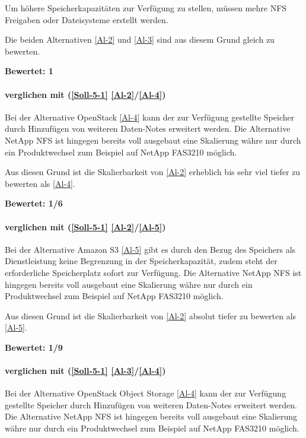 Um höhere Speicherkapazitäten zur Verfügung zu stellen, müssen mehre NFS Freigaben oder Dateisysteme erstellt werden.

Die beiden Alternativen  \ref{Al-2} und  \ref{Al-3} sind aus diesem Grund gleich zu bewerten.

\textbf{Bewertet: 1}


\paragraph*{  verglichen mit  (\ref{Soll-5-1} \ref{Al-2}/\ref{Al-4})}
Bei der Alternative OpenStack \ref{Al-4} kann der zur Verfügung gestellte Speicher durch Hinzufügen von weiteren Daten-Notes erweitert werden. Die Alternative NetApp NFS ist hingegen bereits voll ausgebaut eine Skalierung währe nur durch ein Produktwechsel zum Beispiel auf NetApp FAS3210 möglich.

Aus diesen Grund ist die Skalierbarkeit von  \ref{Al-2} erheblich bis sehr viel tiefer zu bewerten als  \ref{Al-4}.

\textbf{Bewertet: 1/6}

\paragraph*{  verglichen mit  (\ref{Soll-5-1} \ref{Al-2}/\ref{Al-5})}
Bei der Alternative Amazon S3 \ref{Al-5} gibt es durch den Bezug des Speichers als Dienstleistung keine Begrenzung in der Speicherkapazität, zudem steht der erforderliche Speicherplatz sofort zur Verfügung. Die Alternative NetApp NFS ist hingegen bereits voll ausgebaut eine Skalierung währe nur durch ein Produktwechsel zum Beispiel auf NetApp FAS3210 möglich.

Aus diesen Grund ist die Skalierbarkeit von  \ref{Al-2} absolut tiefer zu bewerten als  \ref{Al-5}.

\textbf{Bewertet: 1/9}

\paragraph*{  verglichen mit  (\ref{Soll-5-1} \ref{Al-3}/\ref{Al-4})}
Bei der Alternative OpenStack Object Storage \ref{Al-4} kann der zur Verfügung gestellte Speicher durch Hinzufügen von weiteren Daten-Notes erweitert werden. Die Alternative NetApp NFS ist hingegen bereits voll ausgebaut eine Skalierung währe nur durch ein Produktwechsel zum Beispiel auf NetApp FAS3210 möglich.

